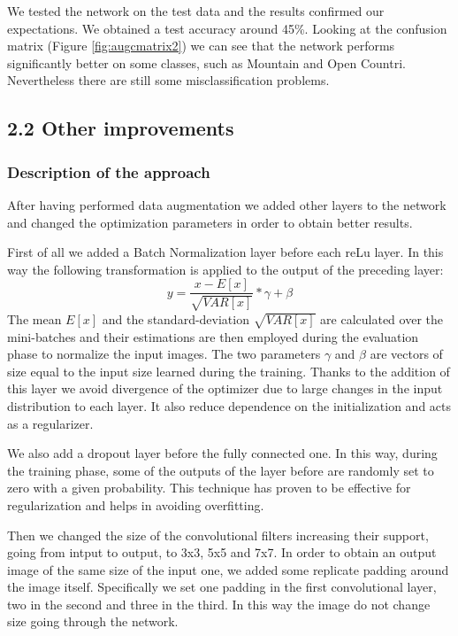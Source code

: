 \documentclass[12pt, a4paper]{report}
\begin{document}
We tested the network on the test data and the results confirmed our expectations. We obtained a test accuracy around 45\%. Looking at the confusion matrix (Figure \ref{fig:augcmatrix2}) we can see that the network performs significantly better on some classes, such as Mountain and Open Countri. Nevertheless there are still some misclassification problems.

\subsection*{2.2 Other improvements}

\subsubsection*{Description of the approach}

After having performed data augmentation we added other layers to the network and changed the optimization parameters in order to obtain better results.

First of all we added a Batch Normalization layer before each reLu layer. In this way the following transformation is applied to the output of the preceding layer:
$$ y = \frac{x - E[x]}{\sqrt{VAR[x]}} * \gamma + \beta$$
The mean $E[x]$ and the standard-deviation $\sqrt{VAR[x]}$ are calculated over the mini-batches and their estimations are then employed during the evaluation phase to normalize the input images. The two parameters $\gamma$ and $\beta$ are vectors of size equal to the input size learned during the training. Thanks to the addition of this layer we avoid divergence of the optimizer due to large changes in the input distribution to each layer. It also reduce dependence on the initialization and acts as a regularizer.

We also add a dropout layer before the fully connected one. In this way, during the training phase, some of the outputs of the layer before are randomly set to zero with a given probability. This technique has proven to be effective for regularization and helps in avoiding overfitting.

Then we changed the size of the convolutional filters increasing their support, going from intput to output, to 3x3, 5x5 and 7x7. In order to obtain an output image of the same size of the input one, we added some replicate padding around the image itself. Specifically we set one padding in the first convolutional layer, two in the second and three in the third. In this way the image do not change size going through the network.
\end{document}
